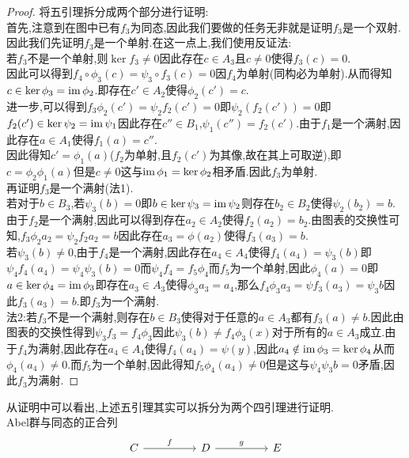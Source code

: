 \documentclass{article}
\begin{document}
\begin{proof}
将五引理拆分成两个部分进行证明:\\
首先,注意到在图中已有$f_3$为同态,因此我们要做的任务无非就是证明$f_3$是一个双射.\\
因此我们先证明$f_3$是一个单射.在这一点上,我们使用反证法:\\
若$f_3$不是一个单射,则$\ker f_3 \neq 0$因此存在$c \in A_3$且$c \neq 0$使得$f_3(c) = 0$.\\
因此可以得到$f_4 \circ \phi_3(c) = \psi_3\circ f_3(c) = 0$因$f_4$为单射(同构必为单射).从而得知$c \in \ker \phi_3 = \operatorname{im} \phi_2$.即存在$c' \in A_2$使得$\phi_2(c') = c$.\\
进一步,可以得到$f_3 \phi_2(c') = \psi_2 f_2(c') = 0$即$\psi_2(f_2(c')) = 0$即$f_2(c')\in \ker \psi_2 = \operatorname{im} \psi_1$因此存在$c''\in B_1$,$\psi_1(c'') = f_2(c')$.由于$f_1$是一个满射,因此存在$a \in A_1$使得$f_1(a) = c''$.\\
因此得知$c' = \phi_1(a)$($f_2$为单射,且$f_2(c')$为其像,故在其上可取逆),即$c = \phi_2\phi_1(a)$但是$c \neq 0$这与$\operatorname{im} \phi_1 = \ker \phi_2$相矛盾.因此$f_3$为单射.\\
再证明$f_3$是一个满射(法1).\\
若对于$b \in B_3$,若$\psi_3(b) =0$即$b \in \ker \psi_3 = \operatorname{im} \psi_2$则存在$b_2 \in B_2$使得$\psi_2(b_2) = b$.由于$f_2$是一个满射,因此可以得到存在$a_2 \in A_2$使得$f_2(a_2) = b_2$.由图表的交换性可知,$f_3\phi_2 a_2 = \psi_2 f_2 a_2 = b$因此存在$a_3 = \phi(a_2)$使得$f_3(a_3) = b$.\\
若$\psi_3(b) \neq 0$,由于$f_4$是一个满射,因此存在$a_4 \in A_4$使得$f_4(a_4) = \psi_3(b)$即$\psi_4 f_4 (a_4) = \psi_4 \psi_3 (b) = 0$而$\psi_4 f_4 = f_5 \phi_4$而$f_5$为一个单射,因此$\phi_4(a) = 0$即$a \in \ker \phi_4 = \operatorname{im} \phi_3$即存在$a_3 \in A_3$使得$\phi_3 a_3 = a_4$,那么$f_4 \phi_3 a_3 = \psi f_3 (a_3) = \psi_3 b$因此$f_3(a_3) = b$.即$f_3$为一个满射.\\
法2:若$f_3$不是一个满射,则存在$b \in B_3$使得对于任意的$a \in A_3$都有$f_3(a) \neq b$.因此由图表的交换性得到$\psi_3 f_3 = f_4 \phi_3$因此$\psi_3(b) \neq f_4 \phi_3(x)$对于所有的$a \in A_3$成立.由于$f_4$为满射,因此存在$a_4 \in A_4$使得$f_4(a_4) = \psi(y)$,因此$a_4 \notin \operatorname{im} \phi_3 = \ker \phi_4$从而$\phi_4(a_4)\neq 0$.而$f_5$为一个单射,因此得知$f_5 \phi_4(a_4)\neq 0$但是这与$\psi_4 \psi_3 b = 0$矛盾,因此$f_3$为满射.
\end{proof}
从证明中可以看出,上述五引理其实可以拆分为两个四引理进行证明.\\
Abel群与同态的正合列
\[\begin{tikzcd}
	C && D && E
	\arrow["f", from=1-1, to=1-3]
	\arrow["g", from=1-3, to=1-5]
\end{tikzcd}\]
\end{document}
